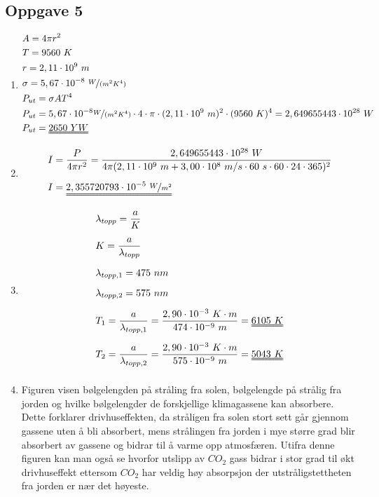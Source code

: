\documentclass[11pt,a4paper]{report}
\newcommand{\opgd}[1]{\item[#1)]}
\newcommand{\opg}[1]{\subsection*{Oppgave #1}}
\begin{document}
\newpage
\opg{5}
\begin{enumerate}[leftmargin=*,itemsep=1cm,labelsep=2em,label=\alph*)]
\opgd{a}
\begin{align*}
&A = 4 \pi r^2\\
&T = 9560\ K\\
&r = 2,11 \cdot 10^9\ m\\
&\sigma = 5,67 \cdot 10^{-8}\ \nicefrac{W}{(m^2 K^4)}\\
&P_{ut} = \sigma A T^4 \\
&P_{ut} = 5,67 \cdot 10^{-8} \nicefrac{W}{(m^2 K^4)} \cdot 4 \cdot \pi \cdot (2,11 \cdot 10^9\ m)^2 \cdot (9560\ K)^4 = 2,649655443 \cdot 10^{28}\ W\\
&P_{ut} = \uuline{2650\ YW}
\end{align*}
\opgd{b}
\begin{align*}
&I = \frac{P}{4 \pi r^2} = \frac{2,649655443 \cdot 10^{28}\ W}{4 \pi (2,11 \cdot 10^9\ m + 3,00 \cdot 10^8\ m/s \cdot 60\ s \cdot 60 \cdot 24 \cdot 365)^2}\\[0.2cm]
&I = \uuline{2,355720793 \cdot 10^{-5}\ \nicefrac{W}{m^2}}
\end{align*}
\opgd{c}
\begin{align*}
&\lambda_{topp} = \frac{a}{K}\\[0.2cm]
&K = \frac{a}{\lambda_{topp}}\\[0.2cm]
&\lambda_{topp,1} = 475\ nm\\[0.2cm]
&\lambda_{topp,2} = 575\ nm\\[0.2cm]
&T_1 = \frac{a}{\lambda_{topp,1}} = \frac{2,90 \cdot 10^{-3}\ K \cdot m}{474 \cdot 10^{-9}\ m} = \uuline{6105\ K}\\[0.2cm]
&T_2 = \frac{a}{\lambda_{topp,2}} = \frac{2,90 \cdot 10^{-3}\ K \cdot m}{575 \cdot 10^{-9}\ m} = \uuline{5043\ K}\\[0.2cm]
\end{align*}
\opgd{d}
Figuren visen bølgelengden på stråling fra solen, bølgelengde på strålig fra jorden og hvilke bølgelengder de forskjellige klimagassene kan absorbere. Dette forklarer drivhuseffekten, da stråligen fra solen stort sett går gjennom gassene uten å bli absorbert, mens strålingen fra jorden i mye større grad blir absorbert av gassene og bidrar til å varme opp atmosfæren. Utifra denne figuren kan man også se hvorfor utslipp av $CO_2$ gass bidrar i stor grad til økt drivhuseffekt ettersom $CO_2$ har veldig høy absorpsjon der utstråligstettheten fra jorden er nær det høyeste.
\end{enumerate}
\end{document}
